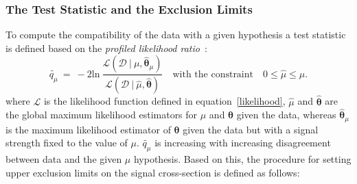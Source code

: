 \subsubsection{The Test Statistic and the Exclusion Limits}
To compute the compatibility of the data with a given hypothesis a test statistic is defined based on the
\emph{profiled likelihood ratio}~\cite{Asympt}: 
\begin{equation}
\tilde{q_{\mu}} ~ = ~ -2 \text{ln} ~ \frac{\mathcal{L}(\mathcal{D}~|~\mu, \hat{\boldsymbol{\theta}}_{\mu})}{\mathcal{L}(\mathcal{D} ~| ~ 
\hat{\mu}, \hat{\boldsymbol{\theta}})}
\quad \text{with the constraint} \quad 0 \leq \hat{\mu} \leq \mu.
\end{equation}
where $\mathcal{L}$ is the likelihood function defined in equation~\eqref{likelihood}, $\hat{\mu}$ and $\hat{\boldsymbol{\theta}}$ 
are the global maximum likelihood estimators for $\mu$ and $\boldsymbol{\theta}$ given the data, 
whereas $\hat{\boldsymbol{\theta}}_{\mu}$ is the maximum likelihood estimator of $\boldsymbol{\theta}$ given the data but  with
a signal strength fixed to the value of $\mu$. $\tilde{q_{\mu}}$ is increasing with 
increasing disagreement between data and the given $\mu$ hypothesis.
Based on this, the procedure for setting upper exclusion limits on the signal cross-section
is defined as follows:
